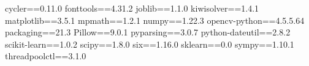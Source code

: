 cycler==0.11.0
fonttools==4.31.2
joblib==1.1.0
kiwisolver==1.4.1
matplotlib==3.5.1
mpmath==1.2.1
numpy==1.22.3
opencv-python==4.5.5.64
packaging==21.3
Pillow==9.0.1
pyparsing==3.0.7
python-dateutil==2.8.2
scikit-learn==1.0.2
scipy==1.8.0
six==1.16.0
sklearn==0.0
sympy==1.10.1
threadpoolctl==3.1.0
